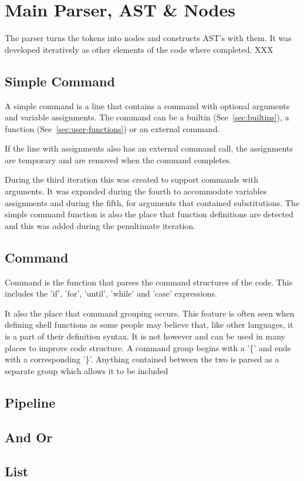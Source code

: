 \section{Main Parser, AST \& Nodes}
The parser turns the tokens into nodes and constructs AST's with them.
It was developed iteratively as other elements of the code where completed. XXX

\subsection{Simple Command}
A simple command is a line that contains a command with optional arguments and variable assignments.
The command can be a builtin (See~\ref{sec:builtins}), a function (See~\ref{sec:user-functions}) or an external command.

If the line with assignments also has an external command call, the assignments are temporary and are removed when the command completes.

During the third iteration this was created to support commands with arguments.
It was expanded during the fourth to accommodate variables assignments and during the fifth, for arguments that contained substitutions.
The simple command function is also the place that function definitions are detected and this was added during the penultimate iteration.

\subsection{Command}
Command is the function that parses the command structures of the code.
This includes the 'if', 'for', 'until', 'while' and 'case' expressions.

It also the place that command grouping occurs.
This feature is often seen when defining shell functions as some people may believe that, like other languages, it is a part of their definition syntax.
It is not however and can be used in many places to improve code structure.
A command group begins with a '\{' and ends with a corresponding '\}'.
Anything contained between the two is parsed as a separate group which allows it to be included
\subsection{Pipeline}
\subsection{And Or}
\subsection{List}

